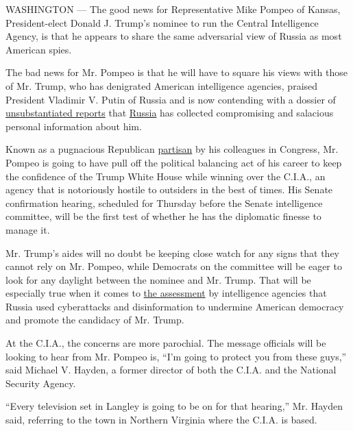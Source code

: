 WASHINGTON --- The good news for Representative Mike Pompeo of Kansas,
President-elect Donald J. Trump's nominee to run the Central
Intelligence Agency, is that he appears to share the same adversarial
view of Russia as most American spies.

The bad news for Mr. Pompeo is that he will have to square his views
with those of Mr. Trump, who has denigrated American intelligence
agencies, praised President Vladimir V. Putin of Russia and is now
contending with a dossier of
\href{https://www.nytimes.com/2017/01/10/us/politics/donald-trump-russia-intelligence.html?hp\&action=click\&pgtype=Homepage\&clickSource=story-heading\&module=first-column-region\&region=top-news\&WT.nav=top-news}{unsubstantiated
reports} that
\href{http://topics.nytimes.com/top/news/international/countriesandterritories/russiaandtheformersovietunion/index.html?inline=nyt-geo}{Russia}
has collected compromising and salacious personal information about him.

Known as a pugnacious Republican
\href{https://www.nytimes.com/2016/11/19/us/politics/donald-trump-mike-pompeo-cia.html}{partisan}
by his colleagues in Congress, Mr. Pompeo is going to have pull off the
political balancing act of his career to keep the confidence of the
Trump White House while winning over the C.I.A., an agency that is
notoriously hostile to outsiders in the best of times. His Senate
confirmation hearing, scheduled for Thursday before the Senate
intelligence committee, will be the first test of whether he has the
diplomatic finesse to manage it.

Mr. Trump's aides will no doubt be keeping close watch for any signs
that they cannot rely on Mr. Pompeo, while Democrats on the committee
will be eager to look for any daylight between the nominee and Mr.
Trump. That will be especially true when it comes to
\href{https://www.nytimes.com/2017/01/06/us/politics/donald-trump-wall-hack-russia.html?hp\&action=click\&pgtype=Homepage\&clickSource=story-heading\&module=first-column-region\&region=top-news\&WT.nav=top-news}{the
assessment} by intelligence agencies that Russia used cyberattacks and
disinformation to undermine American democracy and promote the candidacy
of Mr. Trump.

At the C.I.A., the concerns are more parochial. The message officials
will be looking to hear from Mr. Pompeo is, ``I'm going to protect you
from these guys,'' said Michael V. Hayden, a former director of both the
C.I.A. and the National Security Agency.

``Every television set in Langley is going to be on for that hearing,''
Mr. Hayden said, referring to the town in Northern Virginia where the
C.I.A. is based.

